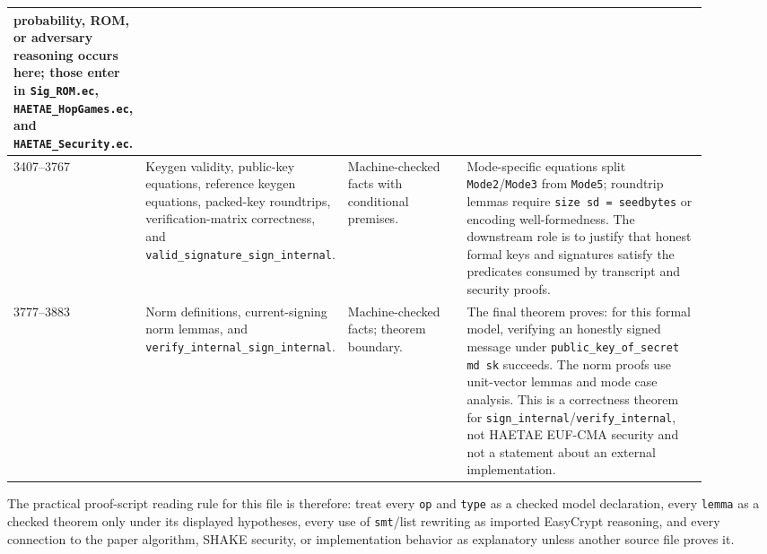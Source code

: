 \documentclass[11pt]{report}
\DeclareRobustCommand{\file}[1]{\ifmmode\text{\nolinkurl{#1}}\else\nolinkurl{#1}\fi}
\DeclareRobustCommand{\ec}[1]{\ifmmode\text{\nolinkurl{#1}}\else\nolinkurl{#1}\fi}
\theoremstyle{definition}
\theoremstyle{plain}
\begin{document}
\begin{longtable}{p{0.13\linewidth}p{0.18\linewidth}p{0.21\linewidth}p{0.38\linewidth}}
probability, ROM, or adversary reasoning occurs here; those enter in
\file{Sig\_ROM.ec}, \file{HAETAE\_HopGames.ec}, and
\file{HAETAE\_Security.ec}. \\
\midrule
3407--3767 &
Keygen validity, public-key equations, reference keygen equations, packed-key
roundtrips, verification-matrix correctness, and
\ec{valid\_signature\_sign\_internal}. &
Machine-checked facts with conditional premises. &
Mode-specific equations split \ec{Mode2}/\ec{Mode3} from \ec{Mode5};
roundtrip lemmas require \ec{size sd = seedbytes} or encoding
well-formedness.  The downstream role is to justify that honest formal keys
and signatures satisfy the predicates consumed by transcript and security
proofs. \\
\midrule
3777--3883 &
Norm definitions, current-signing norm lemmas, and
\ec{verify\_internal\_sign\_internal}. &
Machine-checked facts; theorem boundary. &
The final theorem proves: for this formal model, verifying an honestly signed
message under \ec{public\_key\_of\_secret md sk} succeeds.  The norm proofs
use unit-vector lemmas and mode case analysis.  This is a correctness theorem
for \ec{sign\_internal}/\ec{verify\_internal}, not HAETAE EUF-CMA security and
not a statement about an external implementation. \\
\bottomrule
\end{longtable}

The practical proof-script reading rule for this file is therefore: treat every
\ec{op} and \ec{type} as a checked model declaration, every \ec{lemma} as a
checked theorem only under its displayed hypotheses, every use of
\ec{smt}/list rewriting as imported EasyCrypt reasoning, and every connection
to the paper algorithm, SHAKE security, or implementation behavior as
explanatory unless another source file proves it.
\end{document}
